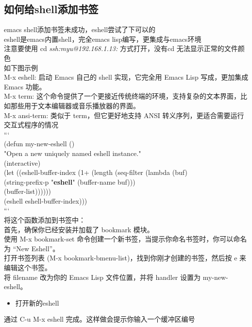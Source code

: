 \documentclass[11pt]{article}
\begin{document}
\subsection{如何给shell添加书签}
\label{sec:orgef8c3f3}
emacs shell添加书签未成功，eshell尝试了下可以的\\
eshell是emacs内置shell，完全emacs lisp编写，更集成与emacs环境\\
注意要使用 cd \emph{ssh:myu@192.168.1.13:} 方式打开，没有cd 无法显示正常的文件颜色\\
如下图示例\\

M-x eshell: 启动 Emacs 自己的 shell 实现，它完全用 Emacs Lisp 写成，更加集成 Emacs 功能。\\
M-x term: 这个命令提供了一个更接近传统终端的环境，支持复杂的文本界面，比如那些用于文本编辑器或音乐播放器的界面。\\
M-x ansi-term: 类似于 term，但它更好地支持 ANSI 转义序列，更适合需要运行交互式程序的情况\\
```\\
(defun my-new-eshell ()\\
  "Open a new uniquely named eshell instance."\\
  (interactive)\\
  (let ((eshell-buffer-index (1+ (length (seq-filter (lambda (buf)\\
                                                       (string-prefix-p "\textbf{eshell}" (buffer-name buf)))\\
                                                     (buffer-list))))))\\
    (eshell eshell-buffer-index)))\\

```\\
将这个函数添加到书签中：\\
首先，确保你已经安装并加载了 bookmark 模块。\\
使用 M-x bookmark-set 命令创建一个新书签，当提示你命名书签时，你可以命名为 “New Eshell”。\\
打开书签列表 (M-x bookmark-bmenu-list)，找到你刚才创建的书签，然后按 e 来编辑这个书签。\\
将 filename 改为你的 Emacs Lisp 文件位置，并将 handler 设置为 my-new-eshell。\\

\begin{itemize}
\item 打开新的eshell\\
\end{itemize}
通过 C-u M-x eshell 完成。这样做会提示你输入一个缓冲区编号\\
\end{document}

